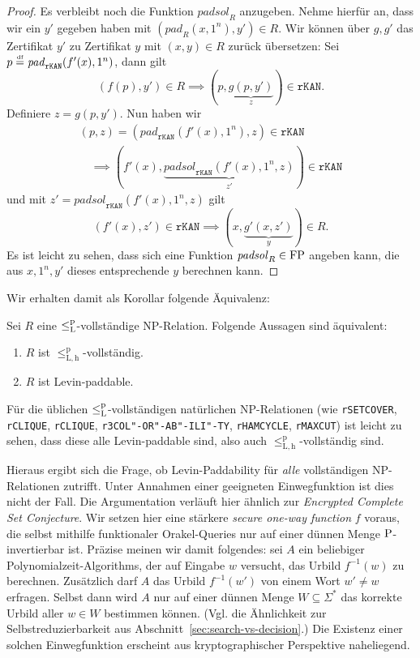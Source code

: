 \begin{proof}
    Es verbleibt noch die Funktion $\mathit{padsol}_R$ anzugeben. Nehme hierfür an, dass wir ein $y'$ gegeben haben mit $(\mathit{pad}_R(x, 1^n), y')\in R$.
    Wir können über $g, g'$ das Zertifikat $y'$ zu Zertifikat $y$ mit $(x, y)\in R$ zurück übersetzen:
    Sei $p\defeq \mathit{pad}_\mathtt{rKAN}(f'(x), 1^n)$, dann gilt
    \[ (f(p), y')\in R \implies (p, \underbrace{g(p, y')}_z)\in \mathtt{rKAN}. \]
    Definiere $z=g(p, y')$.
    Nun haben wir
    \begin{gather*} (p, z)=(\mathit{pad}_\mathtt{rKAN}(f'(x), 1^n), z)\in\mathtt{rKAN}  \\\quad\implies (f'(x), \underbrace{\mathit{padsol}_\mathtt{rKAN}(f'(x), 1^n, z)}_{z'})\in\mathtt{rKAN} \end{gather*}
    und mit $z'=\mathit{padsol}_\mathtt{rKAN}(f'(x), 1^n, z)$ gilt
    \[ (f'(x), z') \in \mathtt{rKAN} \implies (x, \underbrace{g'(x, z')}_{y}) \in R. \]
    Es ist leicht zu sehen, dass sich eine Funktion $\mathit{padsol}_R\in\FP$ angeben kann, die aus $x, 1^n, y'$ dieses entsprechende $y$ berechnen kann.
\end{proof}

Wir erhalten damit als Korollar folgende Äquivalenz:
\begin{corollary}\label{cor:leqlhp-is-paddable}
    Sei $R$ eine $\leqlp$-vollständige NP-Relation. Folgende Aussagen sind äquivalent:
    \begin{enumerate}
        \item $R$ ist $\leq_\mathrm{L,h}^\mathrm p$-vollständig.
        \item $R$ ist Levin-paddable.
    \end{enumerate}
\end{corollary}

Für die üblichen $\leqlp$-vollständigen natürlichen NP-Relationen (wie \texttt{rSETCOVER}, \texttt{rCLIQUE}, \texttt{rCLIQUE}, \texttt{r3COL"-OR"-AB"-ILI"-TY}, \texttt{rHAMCYCLE}, \texttt{rMAXCUT}) ist leicht zu sehen, dass diese alle Levin-paddable sind, also auch $\leq_\mathrm{L,h}^\mathrm p$-vollständig sind.

Hieraus ergibt sich die Frage, ob Levin-Paddability für \emph{alle} vollständigen NP-Relationen zutrifft. Unter Annahmen einer geeigneten Einwegfunktion ist dies nicht der Fall.
Die Argumentation verläuft hier ähnlich zur \emph{Encrypted Complete Set Conjecture}.
Wir setzen hier eine stärkere \emph{secure one-way function} \parencite{grollmann_complexity_1988} $f$ voraus, die selbst mithilfe funktionaler Orakel-Queries nur auf einer dünnen Menge $\P$-invertierbar ist.
Präzise meinen wir damit folgendes: sei $A$ ein beliebiger Polynomialzeit-Algorithms, der auf Eingabe $w$ versucht, das Urbild $f^{-1}(w)$ zu berechnen. Zusätzlich darf $A$ das Urbild $f^{-1}(w')$ von einem Wort $w'\neq w$ erfragen. Selbst dann wird $A$ nur auf einer dünnen Menge $W\subseteq\Sigma^*$ das korrekte Urbild aller $w\in W$ bestimmen können.
(Vgl. die Ähnlichkeit zur Selbstreduzierbarkeit aus Abschnitt~\ref{sec:search-vs-decision}.)
Die Existenz einer solchen Einwegfunktion erscheint aus kryptographischer Perspektive naheliegend.

